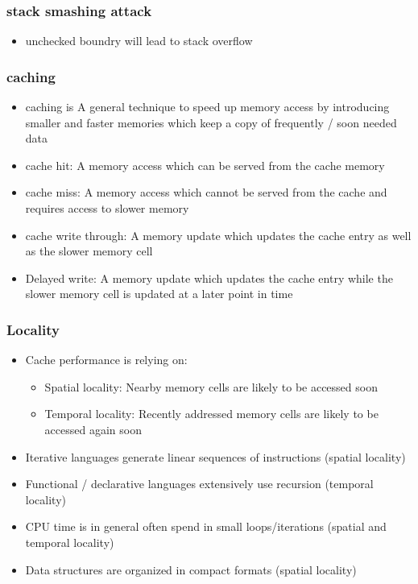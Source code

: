 \documentclass[11pt]{article}
\begin{document}
\subsubsection{stack smashing attack}
\label{sec:org12ea5c6}
\begin{itemize}
\item unchecked boundry will lead to stack overflow
\end{itemize}
\subsubsection{caching}
\label{sec:orgffb58ca}
\begin{itemize}
\item caching is A general technique to speed up memory access by introducing smaller and faster memories which keep a copy of frequently / soon needed data
\item cache hit: A memory access which can be served from the cache memory
\item cache miss: A memory access which cannot be served from the cache and requires access to slower memory
\item cache write through: A memory update which updates the cache entry as well as the slower memory cell
\item Delayed write: A memory update which updates the cache entry while the slower memory cell is updated at a later point in time
\end{itemize}
\subsubsection{Locality}
\label{sec:org5e0a0f7}
\begin{itemize}
\item Cache performance is relying on:
\begin{itemize}
\item Spatial locality: Nearby memory cells are likely to be accessed soon
\item Temporal locality: Recently addressed memory cells are likely to be accessed again soon
\end{itemize}
\item Iterative languages generate linear sequences of instructions (spatial locality)
\item Functional / declarative languages extensively use recursion (temporal locality)
\item CPU time is in general often spend in small loops/iterations (spatial and temporal locality)
\item Data structures are organized in compact formats (spatial locality)
\end{itemize}
\end{document}
